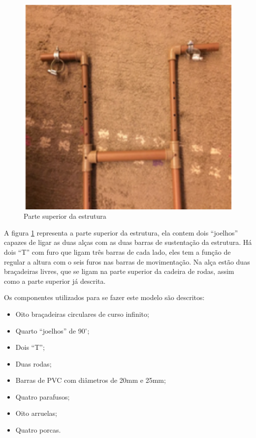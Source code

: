 \begin{figure}[!htb]
\centering
\includegraphics[keepaspectratio=true,scale=0.7]{figuras/resultados/superior_estrutura}
\caption{Parte superior da estrutura}
\label{fig:superior_estrutura}
\end{figure}

A figura \ref{fig:superior_estrutura} representa a parte superior da estrutura, ela contem dois “joelhos” capazes de ligar as duas alças com as duas barras de sustentação da estrutura. Há dois “T” com furo que ligam três barras de cada lado, eles tem a função de regular a altura com o seis furos nas barras de movimentação. Na alça estão duas braçadeiras livres, que se ligam na parte superior da cadeira de rodas, assim como a parte superior já descrita.

Os componentes utilizados para se fazer este modelo são descritos:
\begin{itemize}
  \item Oito braçadeiras circulares de curso infinito;
  \item Quarto “joelhos” de 90$^\circ$;
  \item Dois “T”;
  \item Duas rodas;
  \item Barras de PVC com diâmetros de 20mm e 25mm;
  \item Quatro parafusos;
  \item Oito arruelas;
  \item Quatro porcas.
\end{itemize}

